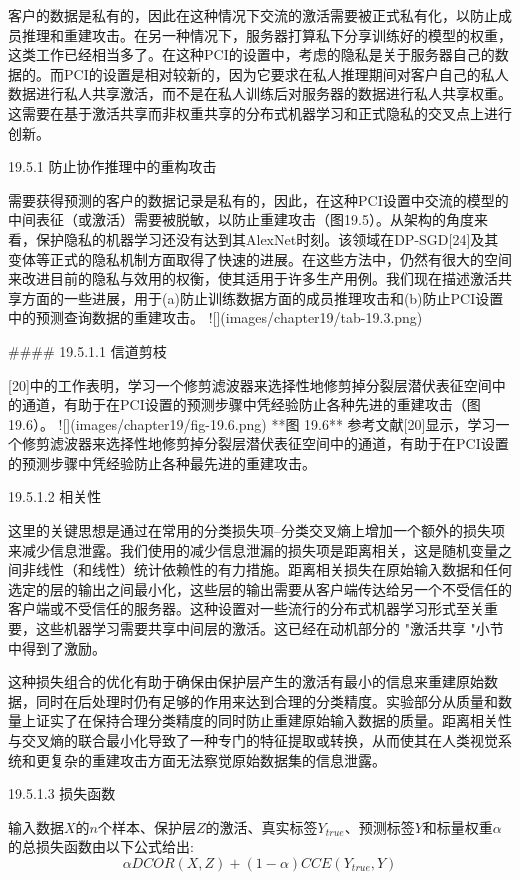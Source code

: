 客户的数据是私有的，因此在这种情况下交流的激活需要被正式私有化，以防止成员推理和重建攻击。在另一种情况下，服务器打算私下分享训练好的模型的权重，这类工作已经相当多了。在这种PCI的设置中，考虑的隐私是关于服务器自己的数据的。而PCI的设置是相对较新的，因为它要求在私人推理期间对客户自己的私人数据进行私人共享激活，而不是在私人训练后对服务器的数据进行私人共享权重。这需要在基于激活共享而非权重共享的分布式机器学习和正式隐私的交叉点上进行创新。

19.5.1 防止协作推理中的重构攻击

需要获得预测的客户的数据记录是私有的，因此，在这种PCI设置中交流的模型的中间表征（或激活）需要被脱敏，以防止重建攻击（图19.5）。从架构的角度来看，保护隐私的机器学习还没有达到其AlexNet时刻。该领域在DP-SGD[24]及其变体等正式的隐私机制方面取得了快速的进展。在这些方法中，仍然有很大的空间来改进目前的隐私与效用的权衡，使其适用于许多生产用例。我们现在描述激活共享方面的一些进展，用于(a)防止训练数据方面的成员推理攻击和(b)防止PCI设置中的预测查询数据的重建攻击。
![](images/chapter19/tab-19.3.png)

#### 19.5.1.1 信道剪枝

[20]中的工作表明，学习一个修剪滤波器来选择性地修剪掉分裂层潜伏表征空间中的通道，有助于在PCI设置的预测步骤中凭经验防止各种先进的重建攻击（图19.6）。
![](images/chapter19/fig-19.6.png)
**图 19.6** 参考文献[20]显示，学习一个修剪滤波器来选择性地修剪掉分裂层潜伏表征空间中的通道，有助于在PCI设置的预测步骤中凭经验防止各种最先进的重建攻击。

19.5.1.2 相关性

这里的关键思想是通过在常用的分类损失项--分类交叉熵上增加一个额外的损失项来减少信息泄露。我们使用的减少信息泄漏的损失项是距离相关，这是随机变量之间非线性（和线性）统计依赖性的有力措施。距离相关损失在原始输入数据和任何选定的层的输出之间最小化，这些层的输出需要从客户端传达给另一个不受信任的客户端或不受信任的服务器。这种设置对一些流行的分布式机器学习形式至关重要，这些机器学习需要共享中间层的激活。这已经在动机部分的 "激活共享 "小节中得到了激励。

这种损失组合的优化有助于确保由保护层产生的激活有最小的信息来重建原始数据，同时在后处理时仍有足够的作用来达到合理的分类精度。实验部分从质量和数量上证实了在保持合理分类精度的同时防止重建原始输入数据的质量。距离相关性与交叉熵的联合最小化导致了一种专门的特征提取或转换，从而使其在人类视觉系统和更复杂的重建攻击方面无法察觉原始数据集的信息泄露。

19.5.1.3 损失函数

输入数据$X$的$n$个样本、保护层$Z$的激活、真实标签$Y_{true}$、预测标签$Y$和标量权重$\alpha$的总损失函数由以下公式给出:
$$
\alpha DCOR(X, Z) + (1 - \alpha) CCE(Y_{true}, Y)
$$


